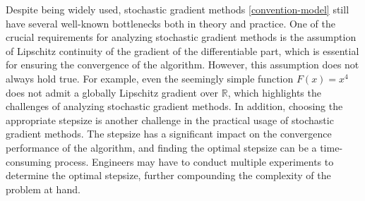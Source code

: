 \documentclass[twoside,11pt]{article}
\newcommand{\R}{\mathbb R}
\def\vx{{\bm{x}}}
\def\vy{{\bm{y}}}
\begin{document}
Despite being widely used, stochastic gradient methods \eqref{convention-model} still have several well-known bottlenecks  both in theory and practice. One of the crucial requirements for analyzing stochastic gradient methods is the assumption of Lipschitz continuity of the gradient of the differentiable part, which is essential for ensuring the convergence of the algorithm. However, this assumption does not always hold true. For example, even the seemingly simple function $F(x)=x^4$ does not admit a globally Lipschitz gradient over $\R$, which highlights the challenges of analyzing stochastic gradient methods. In addition, choosing the appropriate stepsize is another challenge in the practical usage of stochastic gradient methods. The stepsize has a significant impact on the convergence performance of the algorithm, and finding the optimal stepsize can be a time-consuming  process. Engineers may have to conduct multiple experiments to determine the optimal stepsize, further compounding the complexity of the problem at hand.
\end{document}
